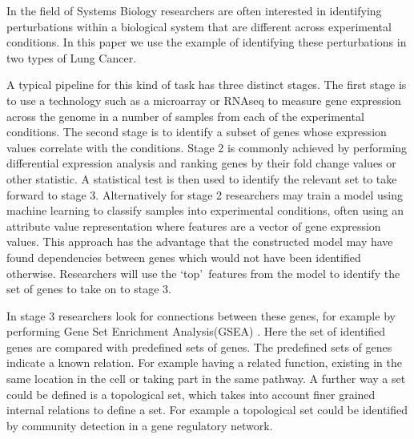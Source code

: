 \documentclass[runningheads,a4paper]{llncs}
\begin{document}
In the field of Systems Biology researchers are often interested in identifying perturbations within a biological system that are different across experimental conditions. In this paper we use the example of identifying these perturbations in two types of Lung Cancer.

A typical pipeline for this kind of task has three distinct stages. The first stage is to use a technology such as a microarray or RNAseq to measure gene expression across the genome in a number of samples from each of the experimental conditions. 
The second stage is to identify a subset of genes whose expression values correlate with the conditions.
Stage 2 is commonly achieved by performing differential expression analysis and ranking genes by their fold change values or other statistic. A statistical test is then used to identify the relevant set to take forward to stage 3. 
Alternatively for stage 2 researchers may train a model using machine learning to classify samples into experimental conditions, often using an attribute value representation where features are a vector of gene expression values. 
This approach has the advantage that the constructed model may have found dependencies between genes which would not have been identified otherwise.
Researchers will use the \lq top\rq\ features from the model to identify the set of genes to take on to stage 3. 


In stage 3  researchers look for connections between these genes, for example by performing Gene Set Enrichment Analysis(GSEA) \citep{subramanian_gene_2005}. Here the set of identified genes are compared with predefined sets of genes. The predefined sets of genes indicate a known relation. For example having a related function, existing in the same location in the cell or taking part in the same pathway. A further way a set could be defined is a topological set, which takes into account finer grained internal relations to define a set. For example a topological set could be identified by community detection in a gene regulatory network.
\end{document}
